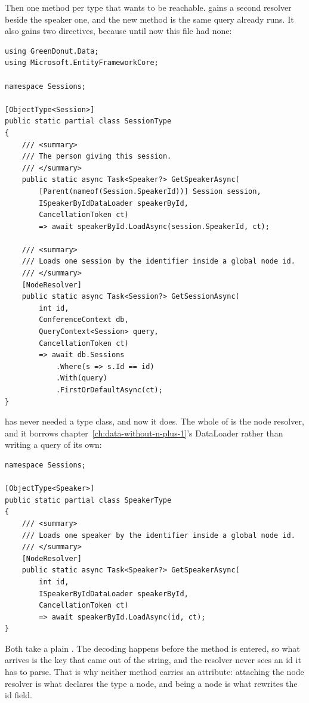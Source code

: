 %
Then one method per type that wants to be reachable. 
gains a second resolver beside the speaker one, and the new method is the same
query  already runs. It also gains two 
directives, because until now this file had none:

\begin{verbatim}
using GreenDonut.Data;
using Microsoft.EntityFrameworkCore;

namespace Sessions;

[ObjectType<Session>]
public static partial class SessionType
{
    /// <summary>
    /// The person giving this session.
    /// </summary>
    public static async Task<Speaker?> GetSpeakerAsync(
        [Parent(nameof(Session.SpeakerId))] Session session,
        ISpeakerByIdDataLoader speakerById,
        CancellationToken ct)
        => await speakerById.LoadAsync(session.SpeakerId, ct);

    /// <summary>
    /// Loads one session by the identifier inside a global node id.
    /// </summary>
    [NodeResolver]
    public static async Task<Session?> GetSessionAsync(
        int id,
        ConferenceContext db,
        QueryContext<Session> query,
        CancellationToken ct)
        => await db.Sessions
            .Where(s => s.Id == id)
            .With(query)
            .FirstOrDefaultAsync(ct);
}
\end{verbatim}

%
 has never needed a type class, and now it does. The whole of
 is the node resolver, and it borrows
chapter~\ref{ch:data-without-n-plus-1}'s DataLoader rather than writing a
query of its own:

\begin{verbatim}
namespace Sessions;

[ObjectType<Speaker>]
public static partial class SpeakerType
{
    /// <summary>
    /// Loads one speaker by the identifier inside a global node id.
    /// </summary>
    [NodeResolver]
    public static async Task<Speaker?> GetSpeakerAsync(
        int id,
        ISpeakerByIdDataLoader speakerById,
        CancellationToken ct)
        => await speakerById.LoadAsync(id, ct);
}
\end{verbatim}

%
Both take a plain . The decoding happens before the method is
entered, so what arrives is the key that came out of the string, and the
resolver never sees an id it has to parse. That is why neither method carries
an \code{[ID]} attribute: attaching the node resolver is what declares the
type a node, and being a node is what rewrites the id field.

